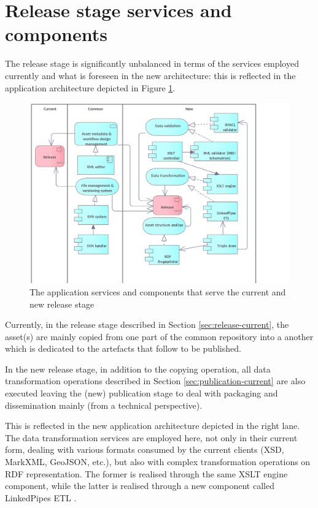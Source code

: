 	\section{Release stage services and components}
	\label{sec:release-application}	
	
	The release stage is significantly unbalanced in terms of the services employed currently and what is foreseen in the new architecture: this is reflected in the application architecture depicted in Figure \ref{fig:application-release}. 
	
	\begin{figure}[h]
		\centering
		\includegraphics[width=.9\textwidth]{images/application/Release v3.png}
		\caption{The application services and components that serve the current and new release stage}
		\label{fig:application-release}
	\end{figure}

    \enlargethispage{3em}
    
	Currently, in the release stage described in Section \ref{sec:release-current}, the asset(s) are mainly copied from one part of the common repository into a another which is dedicated to the artefacts that follow to be published. 
	
	
	
	In the new release stage, in addition to the copying operation, all data transformation operations described in Section \ref{sec:publication-current} are also executed leaving the (new) publication stage to deal with packaging and dissemination mainly (from a technical perspective).
	
	This is reflected in the new application architecture depicted in the right lane. The data transformation services are employed here, not only in their current form, dealing with various formats consumed by the current clients (XSD, MarkXML, GeoJSON, etc.), but also with complex transformation operations on RDF representation. The former is realised through the same XSLT engine component, while the latter is realised through a new component called LinkedPipes ETL \citep{linkedpipes-klimek2016linkedpipes,linkedpipes-klimek2017linkedpipes}.
	
